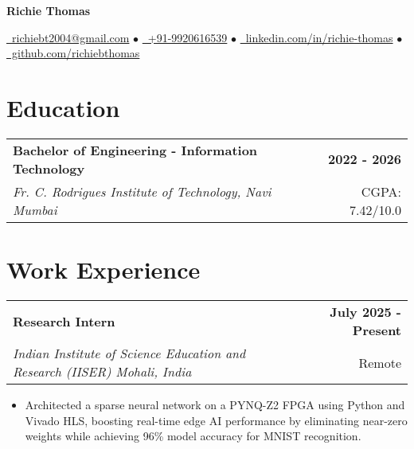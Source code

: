 \documentclass[10pt,a4paper]{article}
\makeatletter
\newcommand{\resumeItem}[1]{\item\small{#1}}
\newcommand{\resumeSubheading}[4]{
  \vspace{0pt}
  \begin{tabular*}{\textwidth}[t]{l@{\extracolsep{\fill}}r}
    \textbf{#1} & \small\textbf{#2} \\
    \textit{\small#3} & \small#4 \\
  \end{tabular*}\vspace{0pt}
}
\makeatother
\begin{document}
\begin{center}
    {\LARGE\bfseries Richie Thomas}
    
    \vspace{0.3em}
    
    \href{mailto:richiebt2004@gmail.com}{\faEnvelope\ richiebt2004@gmail.com} $\bullet$
    \href{tel:+919920616539}{\faMobile\ +91-9920616539} $\bullet$
    \href{https://www.linkedin.com/in/richie-thomas/}{\faLinkedin\ linkedin.com/in/richie-thomas} $\bullet$
    \href{https://github.com/richiebthomas}{\faGithub\ github.com/richiebthomas} 
\end{center}

\vspace{0.2em}

\section{Education}

\resumeSubheading
{Bachelor of Engineering - Information Technology}{2022 - 2026}
{Fr. C. Rodrigues Institute of Technology, Navi Mumbai}{CGPA: 7.42/10.0}

\vspace{0.1em}

\section{Work Experience}

\resumeSubheading
{Research Intern}{July 2025 - Present}
{Indian Institute of Science Education and Research (IISER) Mohali, India}{Remote}
\begin{itemize}
    \resumeItem{Architected a sparse neural network on a PYNQ-Z2 FPGA using Python and Vivado HLS, boosting real-time edge AI performance by eliminating near-zero weights while achieving 96\% model accuracy for MNIST recognition.}
\end{itemize}
\end{document}
